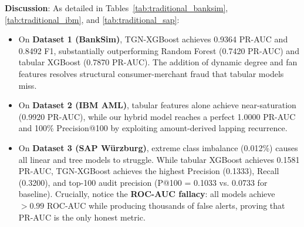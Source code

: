 \documentclass[journal]{IEEEtran}
\begin{document}
\begin{table}[t]
\centering
\caption{Comparison of Performance Metrics with Traditional Machine Learning Models on Dataset 3 (SAP W{\"u}rzburg).}
\label{tab:traditional_sap}
\end{table}

\textbf{Discussion}:
As detailed in Tables~\ref{tab:traditional_banksim}, \ref{tab:traditional_ibm}, and \ref{tab:traditional_sap}:
\begin{itemize}
    \item On \textbf{Dataset 1 (BankSim)}, TGN-XGBoost achieves 0.9364 PR-AUC and 0.8492 F1, substantially outperforming Random Forest (0.7420 PR-AUC) and tabular XGBoost (0.7870 PR-AUC). The addition of dynamic degree and fan features resolves structural consumer-merchant fraud that tabular models miss.
    \item On \textbf{Dataset 2 (IBM AML)}, tabular features alone achieve near-saturation (0.9920 PR-AUC), while our hybrid model reaches a perfect 1.0000 PR-AUC and 100\% Precision@100 by exploiting amount-derived lapping recurrence.
    \item On \textbf{Dataset 3 (SAP W{\"u}rzburg)}, extreme class imbalance (0.012\%) causes all linear and tree models to struggle. While tabular XGBoost achieves 0.1581 PR-AUC, TGN-XGBoost achieves the highest Precision (0.1333), Recall (0.3200), and top-100 audit precision (P@100 = 0.1033 vs. 0.0733 for baseline). Crucially, notice the \textbf{ROC-AUC fallacy}: all models achieve $>0.99$ ROC-AUC while producing thousands of false alerts, proving that PR-AUC is the only honest metric.
\end{itemize}
\end{document}
